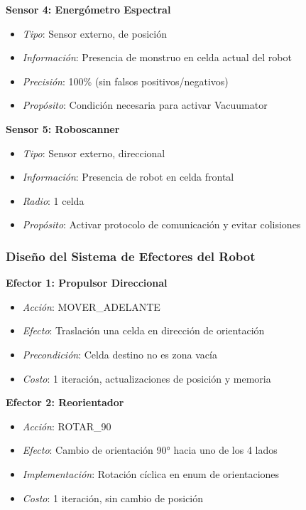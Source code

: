 \documentclass[10pt,twocolumn]{article}
\begin{document}
\textbf{Sensor 4: Energómetro Espectral}
\begin{itemize}
\item \textit{Tipo}: Sensor externo, de posición
\item \textit{Información}: Presencia de monstruo en celda actual del robot
\item \textit{Precisión}: 100\% (sin falsos positivos/negativos)
\item \textit{Propósito}: Condición necesaria para activar Vacuumator
\end{itemize}

\textbf{Sensor 5: Roboscanner}
\begin{itemize}
\item \textit{Tipo}: Sensor externo, direccional
\item \textit{Información}: Presencia de robot en celda frontal
\item \textit{Radio}: 1 celda
\item \textit{Propósito}: Activar protocolo de comunicación y evitar colisiones
\end{itemize}

\subsubsection{Diseño del Sistema de Efectores del Robot}

\textbf{Efector 1: Propulsor Direccional}
\begin{itemize}
\item \textit{Acción}: MOVER\_ADELANTE
\item \textit{Efecto}: Traslación una celda en dirección de orientación
\item \textit{Precondición}: Celda destino no es zona vacía
\item \textit{Costo}: 1 iteración, actualizaciones de posición y memoria
\end{itemize}

\textbf{Efector 2: Reorientador}
\begin{itemize}
\item \textit{Acción}: ROTAR\_90
\item \textit{Efecto}: Cambio de orientación 90° hacia uno de los 4 lados
\item \textit{Implementación}: Rotación cíclica en enum de orientaciones
\item \textit{Costo}: 1 iteración, sin cambio de posición
\end{itemize}
\end{document}
